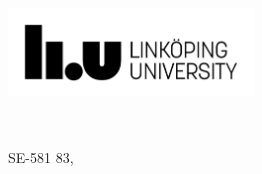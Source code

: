 \begin{titlepage}
\begin{flushbottom}
\begin{minipage}[b]{0.45\textwidth}
\includegraphics[width=6.50cm]{fig/logo}
\end{minipage}\quad~
 \begin{minipage}[b]{0.42\textwidth}
\myFaculty \newline
 \myDepartment \newline
 \myUni \newline
 SE-581 83, \myLocation \newline
\end{minipage}
 

\end{flushbottom}
 


 

\end{titlepage}
 